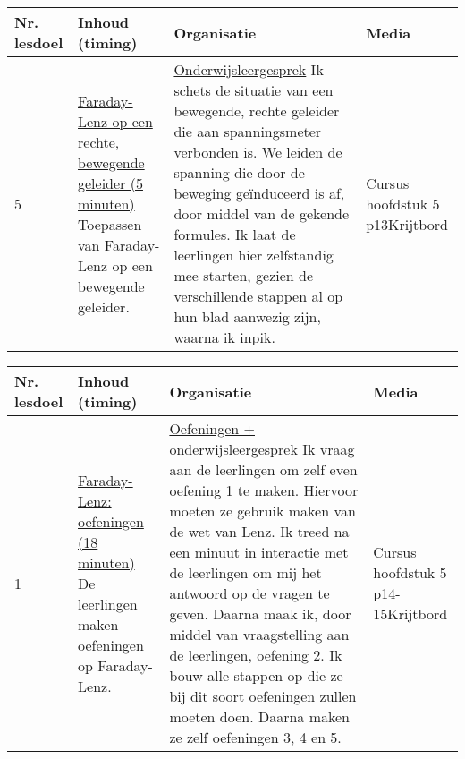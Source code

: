 \begin{landscape}
\begin{tabularx}{1.56\textwidth}{|p{1.5cm}|p{8cm}|X|p{4cm}|}
	\hline
	\textbf{Nr. lesdoel } & \textbf{Inhoud (timing)}  & \textbf{Organisatie } & \textbf{Media } \\ \hline
	5\newline\newline 6&\underline{Faraday-Lenz op een rechte, bewegende} \underline{geleider (5 minuten)}\newline
	Toepassen van Faraday-Lenz op een bewegende geleider.
	&  \underline{Onderwijsleergesprek}\newline 
	Ik schets de situatie van een bewegende, rechte geleider die aan spanningsmeter verbonden is. We leiden de spanning die door de beweging geïnduceerd is af, door middel van de gekende formules. Ik laat de leerlingen hier zelfstandig mee starten, gezien de verschillende stappen al op hun blad aanwezig zijn, waarna ik inpik.
	&   Cursus hoofdstuk 5 p13\newline\newline Krijtbord 
	\\ \hline
\end{tabularx}\vspace{5mm}



\begin{tabularx}{1.56\textwidth}{|p{1.5cm}|p{8cm}|X|p{4cm}|}
	\hline
	\textbf{Nr. lesdoel } & \textbf{Inhoud (timing)}  & \textbf{Organisatie } & \textbf{Media } \\ \hline
    1\newline\newline 4 \newline\newline 7& \underline{Faraday-Lenz: oefeningen (18 minuten)}\newline
    De leerlingen maken oefeningen op Faraday-Lenz.	
	&  \underline{Oefeningen + onderwijsleergesprek}\newline 
	Ik vraag aan de leerlingen om zelf even oefening 1 te maken. Hiervoor moeten ze gebruik maken van de wet van Lenz. Ik treed na een minuut in interactie met de leerlingen om mij het antwoord op de vragen te geven. Daarna maak ik, door middel van vraagstelling aan de leerlingen, oefening 2. Ik bouw alle stappen op die ze bij dit soort oefeningen zullen moeten doen. Daarna maken ze zelf oefeningen 3, 4 en 5.
	&  Cursus hoofdstuk 5 p14-15\newline\newline Krijtbord
	\\ \hline
\end{tabularx}\vspace{5mm}



\end{landscape}
